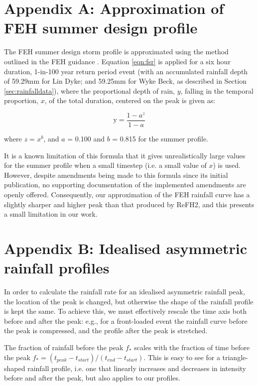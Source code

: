 \documentclass[APA,Times2COL]{WileyNJDv5}
\begin{document}
\section*{Appendix A: Approximation of FEH summer design profile}\label{sec:app_profiles}

The FEH summer design storm profile is approximated using the method outlined in the FEH guidance \citep{kjeldsen2007revitalised}. Equation \ref{eqn:fsr} is applied for a six hour duration, 1-in-100 year return period event (with an accumulated rainfall depth of 59.29mm for Lin Dyke; and 59.25mm for Wyke Beck, as described in Section \ref{sec:rainfalldata}), where the proportional depth of rain, $y$, falling in the temporal proportion, $x$, of the total duration, centered on the peak is given as:

\begin{equation}
\text{y} = \frac{1-a^{z}}{1-a}
 \label{eqn:fsr}
\end{equation}

where \textit{z} = $x^b$, and $a$ = 0.100 and $b$ = 0.815 for the summer profile. 

It is a known limitation of this formula that it gives unrealistically large values for the summer profile when a small timestep (i.e. a small value of $x$) is used. However, despite amendments being made to this formula since its initial publication, no supporting documentation of the implemented amendments are openly offered. Consequently, our approximation of the FEH rainfall curve has a slightly sharper and higher peak than that produced by ReFH2, and this presents a small limitation in our work. 

\section*{Appendix B: Idealised asymmetric rainfall profiles}\label{sec:app_profiles}

In order to calculate the rainfall rate for an idealised asymmetric rainfall peak, the location of the peak is changed, but otherwise the shape of the rainfall profile is kept the same. To achieve this, we must effectively rescale the time axis both before and after the peak: e.g., for a front-loaded event the rainfall curve before the peak is compressed, and the profile after the peak is stretched. 

The fraction of rainfall before the peak $f_*$ scales with the fraction of time before the peak $f_* = (t_{peak}-t_{start})/(t_{end}-t_{start})$. This is easy to see for a triangle-shaped rainfall profile, i.e. one that linearly increases and decreases in intensity before and after the peak, but also applies to our profiles.
\end{document}
